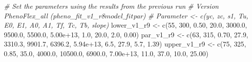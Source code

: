 \documentclass[
]{article}
\newenvironment{Shaded}{\begin{snugshade}}{\end{snugshade}}
\newcommand{\CommentTok}[1]{\textcolor[rgb]{0.56,0.35,0.01}{\textit{#1}}}
\newcommand{\DecValTok}[1]{\textcolor[rgb]{0.00,0.00,0.81}{#1}}
\newcommand{\FloatTok}[1]{\textcolor[rgb]{0.00,0.00,0.81}{#1}}
\newcommand{\FunctionTok}[1]{\textcolor[rgb]{0.00,0.00,0.00}{#1}}
\newcommand{\NormalTok}[1]{#1}
\newcommand{\OtherTok}[1]{\textcolor[rgb]{0.56,0.35,0.01}{#1}}
\begin{document}
\begin{Shaded}
\begin{Highlighting}[]
\CommentTok{\# Set the parameters using the results from the previous run}
\CommentTok{\# Version PhenoFlex\_all (pheno\_fit\_v1\_r8$model\_fit$par)}
\CommentTok{\# Parameter \textless{}{-} c(yc,  zc,   s1,   Tu,     E0,      E1,     A0,       A1,   Tf,   Tc,   Tb, slope)}
\NormalTok{lower\_v1\_r9 }\OtherTok{\textless{}{-}} \FunctionTok{c}\NormalTok{(}\DecValTok{55}\NormalTok{, }\DecValTok{300}\NormalTok{, }\FloatTok{0.50}\NormalTok{, }\FloatTok{20.0}\NormalTok{, }\FloatTok{3000.0}\NormalTok{,  }\FloatTok{9500.0}\NormalTok{, }\FloatTok{5500.0}\NormalTok{, }\FloatTok{5.00e+13}\NormalTok{,  }\FloatTok{1.0}\NormalTok{, }\FloatTok{20.0}\NormalTok{,  }\FloatTok{2.0}\NormalTok{,  }\FloatTok{0.00}\NormalTok{)}
\NormalTok{par\_v1\_r9   }\OtherTok{\textless{}{-}} \FunctionTok{c}\NormalTok{(}\DecValTok{63}\NormalTok{, }\DecValTok{315}\NormalTok{, }\FloatTok{0.70}\NormalTok{, }\FloatTok{27.9}\NormalTok{, }\FloatTok{3310.3}\NormalTok{,  }\FloatTok{9901.7}\NormalTok{, }\FloatTok{6396.2}\NormalTok{, }\FloatTok{5.94e+13}\NormalTok{,  }\FloatTok{6.5}\NormalTok{, }\FloatTok{27.9}\NormalTok{,  }\FloatTok{5.7}\NormalTok{,  }\FloatTok{1.39}\NormalTok{)}
\NormalTok{upper\_v1\_r9 }\OtherTok{\textless{}{-}} \FunctionTok{c}\NormalTok{(}\DecValTok{75}\NormalTok{, }\DecValTok{325}\NormalTok{, }\FloatTok{0.85}\NormalTok{, }\FloatTok{35.0}\NormalTok{, }\FloatTok{4000.0}\NormalTok{, }\FloatTok{10500.0}\NormalTok{, }\FloatTok{6900.0}\NormalTok{, }\FloatTok{7.00e+13}\NormalTok{, }\FloatTok{11.0}\NormalTok{, }\FloatTok{37.0}\NormalTok{, }\FloatTok{10.0}\NormalTok{, }\FloatTok{25.00}\NormalTok{)}



\end{Highlighting}
\end{Shaded}
\end{document}
